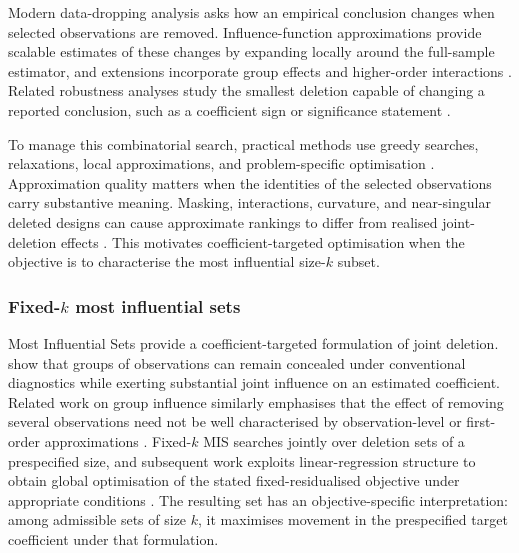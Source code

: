 \documentclass[../main.tex]{subfiles}
\begin{document}
Modern data-dropping analysis asks how an empirical conclusion changes when selected observations are removed. Influence-function approximations provide scalable estimates of these changes by expanding locally around the full-sample estimator, and extensions incorporate group effects and higher-order interactions \parencite{koh2017understanding,koh2019accuracy,basu2020second,fisher2023influence}. Related robustness analyses study the smallest deletion capable of changing a reported conclusion, such as a coefficient sign or significance statement \parencite{giordano2026automatic1,giordano2026automatic2}.

To manage this combinatorial search, practical methods use greedy searches, relaxations, local approximations, and problem-specific optimisation \parencite{price2022hardness,suriyakumar2022algorithms,moitra2022provably,freund2023towards,hu2024most}. Approximation quality matters when the identities of the selected observations carry substantive meaning. Masking, interactions, curvature, and near-singular deleted designs can cause approximate rankings to differ from realised joint-deletion effects \parencite{huang2025approximations,rubinstein2025robustness}. This motivates coefficient-targeted optimisation when the objective is to characterise the most influential size-\(k\) subset.

\subsubsection{Fixed-\texorpdfstring{$k$}{k} most influential sets}
\label{subsubsec:fixed_k_most_influential_sets}

Most Influential Sets provide a coefficient-targeted formulation of joint deletion. \textcite{kuschnig2021hidden} show that groups of observations can remain concealed under conventional diagnostics while exerting substantial joint influence on an estimated coefficient. Related work on group influence similarly emphasises that the effect of removing several observations need not be well characterised by observation-level or first-order approximations \parencite{koh2019accuracy,basu2020second}. Fixed-\(k\) MIS searches jointly over deletion sets of a prespecified size, and subsequent work exploits linear-regression structure to obtain global optimisation of the stated fixed-residualised objective under appropriate conditions \parencite{konrad2026finding}. The resulting set has an objective-specific interpretation: among admissible sets of size \(k\), it maximises movement in the prespecified target coefficient under that formulation.
\end{document}
